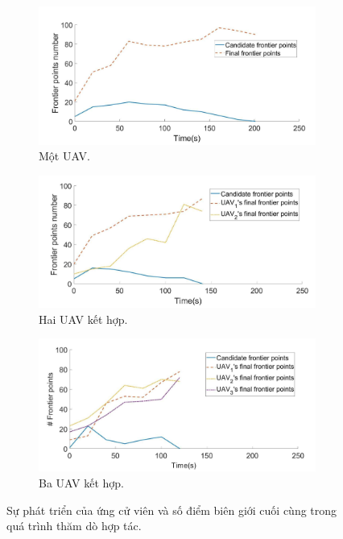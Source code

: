 \documentclass[11pt,openany]{book}
\begin{document}
\begin{figure}[H]
    \centering
    \begin{subfigure}[H]{0.7\linewidth}
        \includegraphics[width=\linewidth]{assets/3_15_a.png}
        \caption{{Một UAV.}}
        \label{fig:3.15a}
    \end{subfigure}
    \begin{subfigure}[H]{0.7\linewidth}
        \includegraphics[width=\linewidth]{assets/3_15_b.png}
        \caption{{Hai UAV kết hợp.}}
        \label{fig:3.15b}
    \end{subfigure}
    \begin{subfigure}[H]{0.7\linewidth}
        \includegraphics[width=\linewidth]{assets/3_15_c.png}
        \caption{{Ba UAV kết hợp.}}
        \label{fig:3.15c}
    \end{subfigure}
    \caption{Sự phát triển của ứng cử viên và số điểm biên giới cuối cùng trong quá trình thăm dò hợp tác.}
    \label{fig:3.15}
\end{figure}
\end{document}

